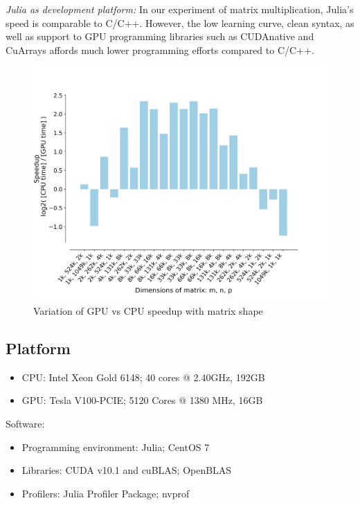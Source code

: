 \documentclass[9pt,twocolumn,twoside,lineno]{gsag3jnl}
\begin{document}
      {\em Julia as development platform:} In our experiment
of matrix multiplication, Julia's speed is comparable to C/C++.
However, the low learning curve, clean syntax, as well as
support to GPU programming libraries such as CUDAnative and
CuArrays affords much lower programming efforts compared to
C/C++.

\begin{figure}[!htb]
	\centering
	\caption{Variation of GPU vs CPU speedup with matrix shape
	}
	\label{GPUCPUShape}
	\includegraphics[scale = 0.4]{figs/speedup.png}
\end{figure} 


\subsection{Platform}
 \begin{itemize}
	\item CPU: Intel Xeon Gold 6148; 40 cores @ 2.40GHz, 192GB 
	\item GPU: Tesla V100-PCIE; 5120 Cores @ 1380 MHz, 16GB
\end{itemize}
Software: 
\begin{itemize}
	\item Programming environment: Julia; CentOS 7
	\item Libraries: CUDA v10.1 and cuBLAS; OpenBLAS
	\item Profilers: Julia Profiler Package; nvprof
\end{itemize}

\end{document}
